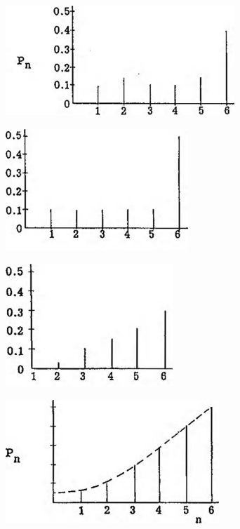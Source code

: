 \documentclass[]{article}
\begin{document}
\begin{figure}
    \centering
    \includegraphics[width=3.39764in,height=1.64567in]{media/image3.jpeg}
    \caption{}
    \label{fig-three}
\end{figure}
\begin{figure}
    \centering
    \includegraphics[width=2.71319in,height=1.81042in]{media/image4.jpeg}
    \caption{}
    \label{fig-four}
\end{figure}
\begin{figure}
    \centering
    \includegraphics[width=2.48031in,height=1.82283in]{media/image5.jpeg}
    \caption{}
    \label{fig-five}
\end{figure}
\begin{figure}
    \centering
    \includegraphics[width=3.16535in,height=1.84252in]{media/image6.jpeg}
    \caption{}
    \label{fig-six}
\end{figure}
\end{document}

